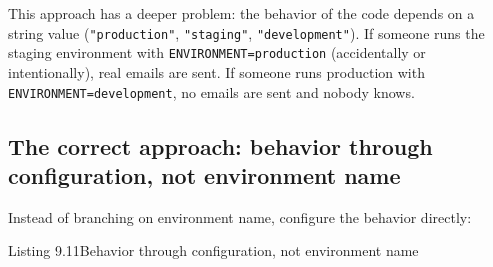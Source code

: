 This approach has a deeper problem: the behavior of the code depends on a string value (\texttt{"production"}, \texttt{"staging"}, \texttt{"development"}). If someone runs the staging environment with \texttt{ENVIRONMENT=}\allowbreak{}\texttt{production} (accidentally or intentionally), real emails are sent. If someone runs production with \texttt{ENVIRONMENT=}\allowbreak{}\texttt{development}, no emails are sent and nobody knows.

\subsection*{\texorpdfstring{The correct approach: behavior through configuration, not environment
name}{The correct approach: behavior through configuration, not environment name}}\label{09-configuration-coupling:the-correct-approach-behavior-through-configuration-not-environment-name}

Instead of branching on environment name, configure the behavior directly:

\begin{codeboxcap}[short]{\textcolor{accent}{Listing 9.11}\enspace Behavior through configuration, not environment name}

\begin{Shaded}
\begin{Highlighting}[]

\OperatorTok{=}\NormalTok{, }\NormalTok{)}
\OperatorTok{=} \NormalTok{, }\NormalTok{))  }
\OperatorTok{=}\NormalTok{)  }

\NormalTok{):}
\OperatorTok{=}
\OperatorTok{=} \SpecialCharTok{\{}\SpecialCharTok{\}} 
\OperatorTok{=}\OperatorTok{=}
\end{Highlighting}
\end{Shaded}

\end{codeboxcap}

